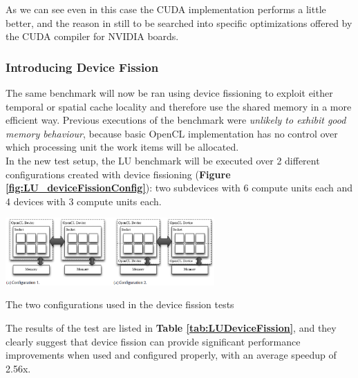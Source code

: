 As we can see even in this case the CUDA implementation performs a little better, and the reason in still to be searched into specific optimizations offered by the CUDA compiler for NVIDIA boards.

\subsubsection{Introducing Device Fission}

The same benchmark will now be ran using device fissioning to exploit either temporal or spatial cache locality and therefore use the shared memory in a more efficient way. Previous executions of the benchmark were \emph{unlikely to exhibit good memory behaviour}, because basic OpenCL implementation has no control over which processing unit the work items will be allocated.\\
In the new test setup, the LU benchmark will be executed over 2 different configurations created with device fissioning (\textbf{Figure \ref{fig:LU_deviceFissionConfig}}): two subdevices with 6 compute units each and 4 devices with 3 compute units each.

\begin{figurehere}
 \centering
 \includegraphics[width=8cm]{./eps/LU_deviceFissionConfig.eps}
 \caption{The two configurations used in the device fission tests}
 \label{fig:LU_deviceFissionConfig}
\end{figurehere}

The results of the test are listed in \textbf{Table \ref{tab:LUDeviceFission}}, and they clearly suggest that device fission can provide significant performance improvements when used and configured properly, with an average speedup of 2.56x. \\

